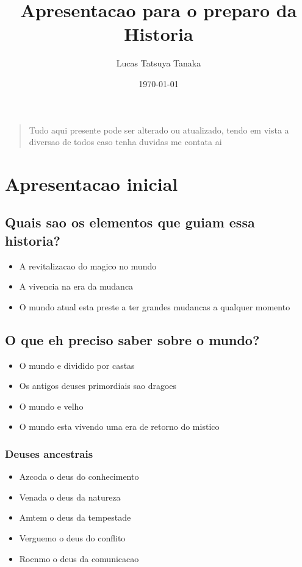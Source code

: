 \documentclass{book}
\title{Apresentacao para o preparo da Historia}
\author{Lucas Tatsuya Tanaka}
\date{\today}
\begin{document}
\maketitle
\tableofcontents

\vspace*{\fill} 
\begin{quote} 
\centering 
\Large {Tudo aqui presente pode ser alterado ou atualizado, tendo em vista a diversao de todos
\huge {caso tenha duvidas me contata ai }}

\end{quote}
\vspace*{\fill}



\part{Apresentacao inicial}
\chapter{Quais sao os elementos que guiam essa historia?}
\begin{itemize}
    \item A revitalizacao do magico no mundo
    \item A vivencia na era da mudanca 
    \item O mundo atual esta preste a ter grandes mudancas a qualquer momento
\end{itemize}


\chapter{O que eh preciso saber sobre o mundo?}
\begin{itemize}
    \item O mundo e dividido por castas 
    \item Os antigos deuses primordiais sao dragoes
    \item O mundo e velho 
    \item O mundo esta vivendo uma era de retorno do mistico 

\end{itemize}
\section{Deuses ancestrais}
\begin{itemize}
    \item Azcoda o deus do conhecimento
    \item Venada o deus da natureza
    \item Amtem o deus da tempestade
    \item Verguemo o deus do conflito
    \item Roenmo o deus da comunicacao
\end{itemize}
\end{document}
